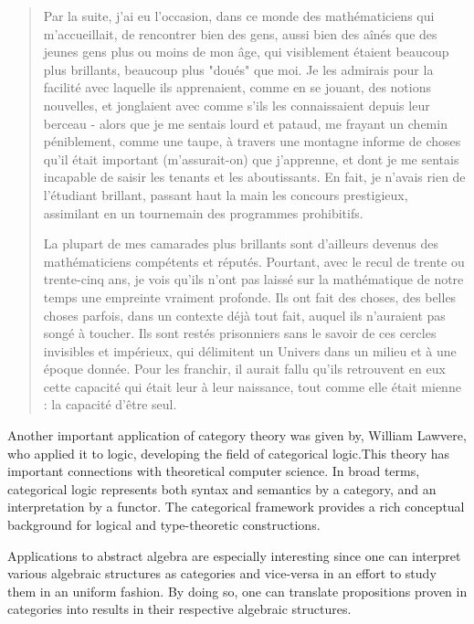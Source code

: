 \begin{quotation}
Par la suite, j'ai eu l'occasion, dans ce monde des mathématiciens qui m'accueillait, de rencontrer bien des gens, aussi bien des aînés que des jeunes gens plus ou moins de mon âge, qui visiblement étaient beaucoup plus brillants, beaucoup plus "doués" que moi. Je les admirais pour la facilité avec laquelle ils apprenaient, comme en se jouant, des notions nouvelles, et jonglaient avec comme s'ils les connaissaient depuis leur berceau - alors que je me sentais lourd et pataud, me frayant un chemin péniblement, comme une taupe, à travers une montagne informe de choses qu'il était important (m'assurait-on) que j'apprenne, et dont je me sentais incapable de saisir les tenants et les aboutissants. En fait, je n'avais rien de l'étudiant brillant, passant haut la main les concours prestigieux, assimilant en un tournemain des programmes prohibitifs.

La plupart de mes camarades plus brillants sont d'ailleurs devenus des mathématiciens compétents et réputés. Pourtant, avec le recul de trente ou trente-cinq ans, je vois qu'ils n'ont pas laissé sur la mathématique de notre temps une empreinte vraiment profonde. Ils ont fait des choses, des belles choses parfois, dans un contexte déjà tout fait, auquel ils n'auraient pas songé à toucher. Ils sont restés prisonniers sans le savoir de ces cercles invisibles et impérieux, qui délimitent un Univers dans un milieu et à une époque donnée. Pour les franchir, il aurait fallu qu'ils retrouvent en eux cette capacité qui était leur à leur naissance, tout comme elle était mienne : la capacité d'être seul.
\end{quotation}

Another important application of category theory was given by, William
Lawvere, who applied it to logic, developing the field of categorical logic.This theory has important connections with theoretical computer science. In broad terms, categorical logic represents both syntax and semantics by a category, and an interpretation by a functor. The categorical framework provides a rich conceptual background for logical and type-theoretic constructions. 

Applications  to  abstract  algebra  are  especially
interesting  since  one  can  interpret  various  algebraic  structures  as categories and vice-versa in an effort to study them in an uniform fashion.  By
doing so, one can translate propositions proven in categories into results in their respective
algebraic structures.


